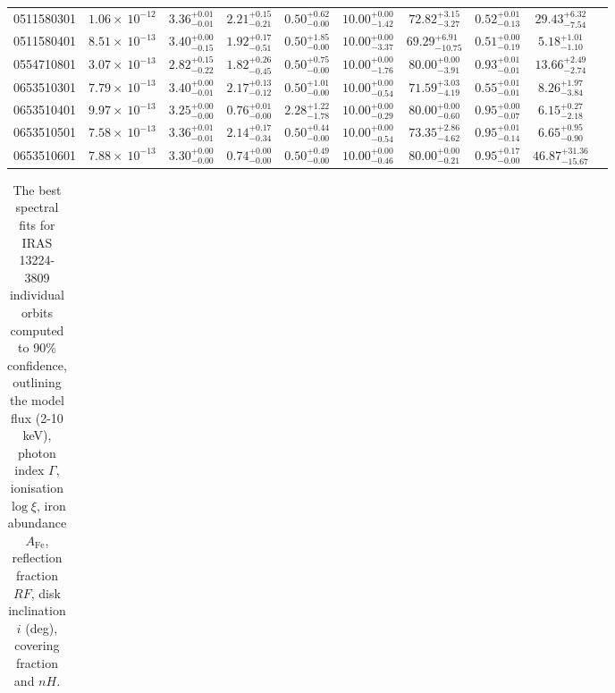 \documentclass{article}
\begin{document}
\begin{landscape}
\begin{longtable}{cccccccccl}
0511580301 & $1.06 \times~10^{-12}$ & $3.36^{+0.01}_{-0.01}$ & $2.21^{+0.15}_{-0.21}$ & $0.50^{+0.62}_{-0.00}$ & $10.00^{+0.00}_{-1.42}$ & $72.82^{+3.15}_{-3.27}$ &  $0.52^{+0.01}_{-0.13}$ & $29.43^{+6.32}_{-7.54}$\\
0511580401 & $8.51 \times~10^{-13}$ & $3.40^{+0.00}_{-0.15}$ & $1.92^{+0.17}_{-0.51}$ & $0.50^{+1.85}_{-0.00}$ & $10.00^{+0.00}_{-3.37}$ & $69.29^{+6.91}_{-10.75}$ &  $0.51^{+0.00}_{-0.19}$ & $5.18^{+1.01}_{-1.10}$ \\
0554710801 & $3.07 \times~10^{-13}$ & $2.82^{+0.15}_{-0.22}$ & $1.82^{+0.26}_{-0.45}$ & $0.50^{+0.75}_{-0.00}$ & $10.00^{+0.00}_{-1.76}$ & $80.00^{+0.00}_{-3.91}$ &  $0.93^{+0.01}_{-0.01}$ & $13.66^{+2.49}_{-2.74}$\\
0653510301 & $7.79 \times~10^{-13}$ & $3.40^{+0.00}_{-0.01}$ & $2.17^{+0.13}_{-0.12}$ & $0.50^{+1.01}_{-0.00}$ & $10.00^{+0.00}_{-0.54}$ & $71.59^{+3.03}_{-4.19}$ &  $0.55^{+0.01}_{-0.01}$ & $8.26^{+1.97}_{-3.84}$\\
0653510401 & $9.97 \times~10^{-13}$ & $3.25^{+0.00}_{-0.00}$ & $0.76^{+0.01}_{-0.00}$ & $2.28^{+1.22}_{-1.78}$ & $10.00^{+0.00}_{-0.29}$ & $80.00^{+0.00}_{-0.60}$ &  $0.95^{+0.00}_{-0.07}$ & $6.15^{+0.27}_{-2.18}$\\
0653510501 & $7.58 \times~10^{-13}$ & $3.36^{+0.01}_{-0.01}$ & $2.14^{+0.17}_{-0.34}$ & $0.50^{+0.44}_{-0.00}$ & $10.00^{+0.00}_{-0.54}$ & $73.35^{+2.86}_{-4.62}$ &  $0.95^{+0.01}_{-0.14}$ & $6.65^{+0.95}_{-0.90}$\\
0653510601 & $7.88 \times~10^{-13}$ & $3.30^{+0.00}_{-0.00}$ & $0.74^{+0.00}_{-0.00}$ & $0.50^{+0.49}_{-0.00}$ & $10.00^{+0.00}_{-0.46}$ & $80.00^{+0.00}_{-0.21}$ &  $0.95^{+0.17}_{-0.00}$ & $46.87^{+31.36}_{-15.67}$\\
\end{longtable}


\clearpage

\begin{longtable}{cccccccccl}
\caption[IRAS 13224-3809 individual orbits Relxill spectral fits]{The best spectral fits for IRAS 13224-3809 individual orbits computed to 90\% confidence, outlining the model flux (2-10 keV), photon index $\Gamma$, ionisation $\log\xi$, iron abundance $A_\text{Fe}$, reflection fraction $RF$, disk inclination $i$ (deg), covering fraction and $nH$.}\\


\end{longtable}
\end{landscape}
\end{document}

